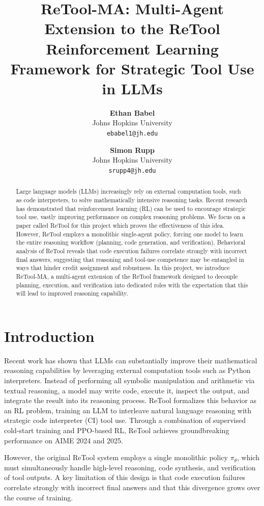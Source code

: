 \documentclass{article}
\title{
  ReTool-MA: Multi-Agent Extension to the ReTool Reinforcement Learning Framework 
  for Strategic Tool Use in LLMs
}
\author{
  \textbf{Ethan Babel} \\
  Johns Hopkins University \\
  \texttt{ebabel1@jh.edu}
  \and
  \textbf{Simon Rupp} \\
  Johns Hopkins University \\
  \texttt{srupp4@jh.edu}
}
\begin{document}
\makeatletter
\renewcommand{\@noticestring}{}
\makeatother


\maketitle

\begin{abstract}
  Large language models (LLMs) increasingly rely on external computation tools,
  such as code interpreters, to solve mathematically intensive reasoning tasks.
  Recent research has demonstrated that reinforcement learning (RL) can be used to 
  encourage strategic tool use, vastly improving performance on complex reasoning problems. 
  We focus on a paper called ReTool for this project which proves the effectiveness of this idea. However, ReTool employs a monolithic single-agent policy, forcing one model to learn the entire reasoning workflow (planning, code generation, and verification). Behavioral analysis of ReTool reveals that code execution failures correlate strongly with incorrect final answers, 
  suggesting that reasoning and tool-use competence may be entangled in ways that hinder
  credit assignment and robustness. In this project, we introduce ReTool-MA, a 
  multi-agent extension of the ReTool framework designed to decouple planning, execution, 
  and verification into dedicated roles with the expectation that this will lead to improved reasoning capability.
\end{abstract}

\section{Introduction}

Recent work has shown that LLMs can substantially
improve their mathematical reasoning capabilities by leveraging external
computation tools such as Python interpreters. Instead of performing all
symbolic manipulation and arithmetic via textual reasoning, a model may write code,
execute it, inspect the output, and integrate the result into its reasoning
process. ReTool \citep{feng2025retoolreinforcementlearningstrategic} formalizes
this behavior as an RL problem, training an LLM to
interleave natural language reasoning with strategic code interpreter (CI) tool
use. Through a combination of supervised cold-start training and PPO-based RL,
ReTool achieves groundbreaking performance on AIME 2024 and 2025.

However, the original ReTool system employs a single monolithic policy
$\pi_\theta$, which must simultaneously handle high-level reasoning, code
synthesis, and verification of tool outputs. A key
limitation of this design is that code execution failures correlate strongly with
incorrect final answers and that this divergence grows over the course of training.
\end{document}
